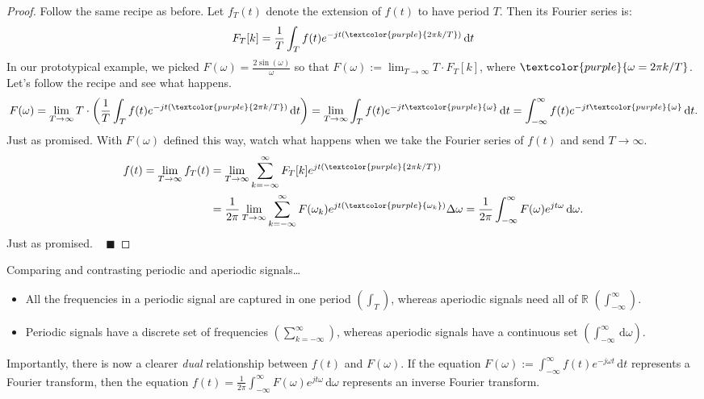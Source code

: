 \begin{proof}
    Follow the same recipe as before.
    Let $f_T(t)$ denote the extension of $f(t)$ to have period $T$.
    Then its Fourier series is:
    \[ F_T[k] = \frac{1}{T} \int_T f(t) e^{-jt(\textcolor{purple}{2\pi k/T})} \, \mathrm{d}t \]
    In our prototypical example,
    we picked $F(\omega) = \frac{2\sin(\omega)}{\omega}$ so that
    $F(\omega) := \lim_{T \to \infty} T \cdot F_T[k]$, where
    $\textcolor{purple}{\omega = 2\pi k/T}$.
    Let's follow the recipe and see what happens.
    \[ F(\omega) = \lim_{T \to \infty} T \cdot
    \left(\frac{1}{T} \int_T f(t) e^{-jt(\textcolor{purple}{2\pi k/T})} \, \mathrm{d}t\right)
    = \lim_{T \to \infty} \int_T f(t) e^{-jt\textcolor{purple}{\omega}} \, \mathrm{d}t
    = \int_{-\infty}^{\infty} f(t) e^{-jt\textcolor{purple}{\omega}} \, \mathrm{d}t. \]
    Just as promised.  With $F(\omega)$ defined this way,
    watch what happens when we take the Fourier series of $f(t)$ and send $T \to \infty$.
    \begin{align*}
        f(t) = \lim_{T \to \infty} f_T(t) & =
        \lim_{T \to \infty}
        \sum_{k = -\infty}^{\infty} F_T[k] e^{jt(\textcolor{purple}{2\pi k/T})} \\
        & = \frac{1}{2\pi} \lim_{T \to \infty} \sum_{k = -\infty}^{\infty} F(\omega_k)
        e^{jt(\textcolor{purple}{\omega_k})} \Delta \omega
        = \frac{1}{2\pi}\int_{-\infty}^{\infty} F(\omega) e^{jt\omega} \, \mathrm{d}\omega.
    \end{align*}
    Just as promised. ~ $\blacksquare$
\end{proof}

\begin{remark}
    Comparing and contrasting periodic and aperiodic signals\dots
    \begin{itemize}
        \item All the frequencies in a periodic signal
        are captured in one period $\left(\int_T\right)$,
        whereas aperiodic signals need all of $\mathbb{R}$
        $\left(\int_{-\infty}^{\infty}\right)$.
        \item Periodic signals have a discrete set of frequencies
        $\left(\sum_{k = -\infty}^{\infty}\right)$, whereas
        aperiodic signals have a continuous set
        $\left(\int_{-\infty}^{\infty} \, \mathrm{d}\omega\right)$.
    \end{itemize}
\end{remark}

Importantly, there is now a clearer \emph{dual} relationship
between $f(t)$ and $F(\omega)$.  If the equation
$F(\omega) := \int_{-\infty}^{\infty} f(t) e^{-j\omega t} \, \mathrm{d}t$
represents a Fourier transform, then the equation
$f(t) = \frac{1}{2\pi} \int_{-\infty}^{\infty} F(\omega) e^{jt \omega} \, \mathrm{d}\omega$
represents an inverse Fourier transform.

